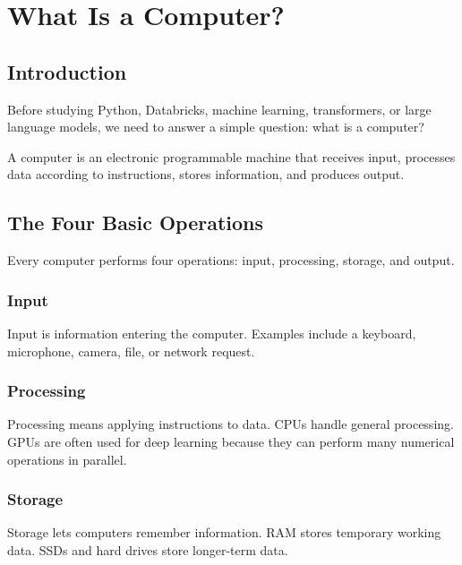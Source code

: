 \chapter{What Is a Computer?}
\label{chap:what-is-a-computer}
\section{Introduction}
Before studying Python, Databricks, machine learning, transformers, or large language models, we need to answer a simple question: what is a computer?
\begin{definition}A computer is an electronic programmable machine that receives input, processes data according to instructions, stores information, and produces output.\end{definition}
\section{The Four Basic Operations}
Every computer performs four operations: input, processing, storage, and output.
\subsection{Input}Input is information entering the computer. Examples include a keyboard, microphone, camera, file, or network request.
\subsection{Processing}Processing means applying instructions to data. CPUs handle general processing. GPUs are often used for deep learning because they can perform many numerical operations in parallel.
\subsection{Storage}Storage lets computers remember information. RAM stores temporary working data. SSDs and hard drives store longer-term data.
